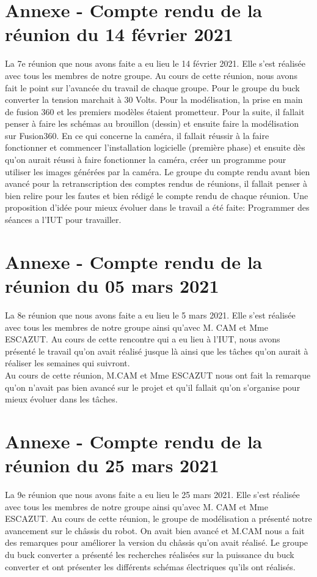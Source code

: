 \documentclass{PackagerQualityN}
\begin{document}
\newp
\section*{Annexe - Compte rendu de la réunion du 14 février 2021}
La 7e réunion que nous avons faite a eu lieu le 14 février 2021. Elle s'est réalisée avec tous les membres de notre groupe.
Au cours de cette réunion, nous avons fait le point sur l'avancée du travail de chaque groupe.
Pour le groupe du buck converter la tension marchait à 30 Volts.
Pour la modélisation, la prise en main de fusion 360 et les premiers modèles étaient prometteur. Pour la suite, il fallait  penser à faire les schémas au  brouillon (dessin) et ensuite faire la modélisation sur Fusion360. 
En ce qui concerne la caméra, il fallait réussir à la faire fonctionner et commencer l'installation logicielle (première phase) et ensuite dès qu'on aurait réussi à faire fonctionner la caméra, créer un programme pour utiliser les images générées par la caméra.
Le groupe du compte rendu avant bien avancé pour la retranscription des comptes rendus de réunions, il fallait penser à bien relire pour les fautes et bien rédigé le compte rendu de chaque réunion.
Une proposition d'idée pour mieux évoluer dans le travail a été faite:
Programmer des séances a l'IUT pour travailler.

\newp
\section*{Annexe - Compte rendu de la réunion du 05 mars 2021}
La 8e réunion que nous avons faite a eu lieu le 5 mars 2021. Elle s'est réalisée avec tous les membres de notre groupe ainsi qu'avec M. CAM et Mme ESCAZUT.
Au cours de cette rencontre qui a eu lieu à l'IUT, nous avons présenté le travail qu'on avait réalisé jusque là ainsi que les tâches qu'on aurait à réaliser les semaines qui suivront. 
\\
Au cours de cette réunion, M.CAM et Mme ESCAZUT nous ont fait la remarque qu'on n’avait pas bien avancé sur le projet et qu'il fallait qu'on s'organise pour mieux évoluer dans les tâches. 
\\

\newp
\section*{Annexe - Compte rendu de la réunion du 25 mars 2021}
La 9e réunion que nous avons faite a eu lieu le 25 mars 2021. Elle s'est réalisée avec tous les membres de notre groupe ainsi qu'avec M. CAM et Mme ESCAZUT.
Au cours de cette réunion, le groupe de modélisation a présenté notre avancement sur le châssis du robot. On avait bien avancé et M.CAM nous a fait des remarques pour améliorer la version du châssis qu'on avait réalisé. 
Le groupe du buck converter a présenté les recherches réalisées sur la puissance du buck converter et ont présenter les différents schémas électriques qu'ils ont réalisés.
\end{document}
